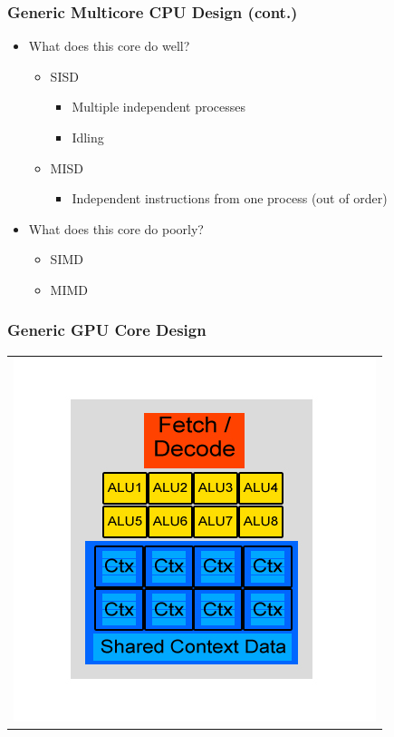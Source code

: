 \documentclass{beamer}
\begin{document}
\begin{frame}
	\frametitle{Generic Multicore CPU Design (cont.)}
	\begin{itemize}
		\item<1-> What does this core do well?
		\begin{itemize}
			\item<2-> SISD
			\begin{itemize}
				\item<2-> Multiple independent processes
				\item<2-> Idling
			\end{itemize}
			\item<3-> MISD
			\begin{itemize}
				\item<3-> Independent instructions from one process (out of order)
			\end{itemize}
		\end{itemize}
		\item<4-> What does this core do poorly?
		\begin{itemize}
			\item<5-> SIMD
			\item<5-> MIMD
		\end{itemize}
	\end{itemize}
\end{frame}

\begin{frame}
	\frametitle{Generic GPU Core Design}
	\begin{tabular}{c}
		\includegraphics[width=.75\textwidth]{GPU-Design.jpg}
	\end{tabular}
\end{frame}
\end{document}
